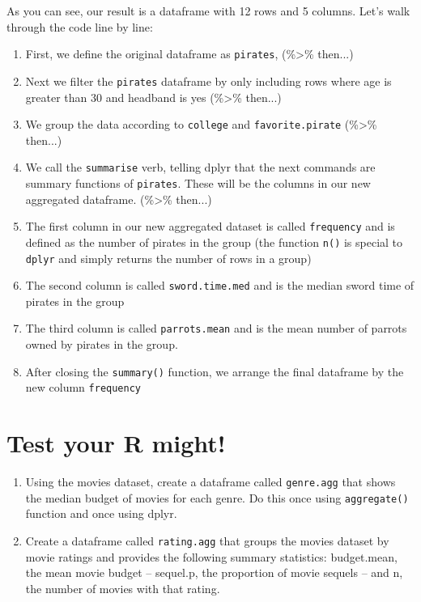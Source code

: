 \documentclass{tufte-book}\usepackage[]{graphicx}\usepackage[]{color}
\begin{document}
As you can see, our result is a dataframe with 12 rows and 5 columns. Let's walk through the code line by line:

\begin{enumerate}

  \item First, we define the original dataframe as \texttt{pirates}, (\%>\% then...)
  \item Next we filter the \texttt{pirates} dataframe by only including rows where age is greater than 30 and headband is yes (\%>\% then...)
  \item We group the data according to \texttt{college} and \texttt{favorite.pirate} (\%>\% then...)
  \item We call the \texttt{summarise} verb, telling dplyr that the next commands are summary functions of \texttt{pirates}. These will be the columns in our new aggregated dataframe. (\%>\% then...)
  \item The first column in our new aggregated dataset is called \texttt{frequency} and is defined as the number of pirates in the group (the function \texttt{n()} is special to \texttt{dplyr} and simply returns the number of rows in a group)
  \item The second column is called \texttt{sword.time.med} and is the median sword time of pirates in the group
  \item The third column is called \texttt{parrots.mean} and is the mean number of parrots owned by pirates in the group.
  \item After closing the \texttt{summary()} function, we arrange the final dataframe by the new column \texttt{frequency}

\end{enumerate}


\section{Test your R might!}

\begin{enumerate}

\item Using the movies dataset, create a dataframe called \texttt{genre.agg} that shows the median budget of movies for each genre. Do this once using \texttt{aggregate()} function and once using dplyr.

\item Create a dataframe called \texttt{rating.agg} that groups the movies dataset by movie ratings and provides the following summary statistics: budget.mean, the mean movie budget -- sequel.p, the proportion of movie sequels -- and n, the number of movies with that rating.

\end{enumerate}
\end{document}
